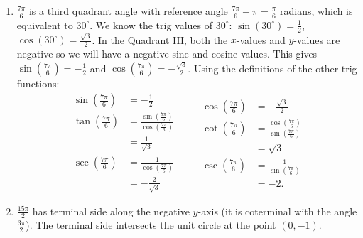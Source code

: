 \documentclass[nooutcomes]{ximera}
\begin{document}
\begin{exercise}
\begin{explanation}
\begin{enumerate}
			\item $\frac{7\pi}{6}$ is a third quadrant angle with reference angle $\frac{7\pi}{6} - \pi = \frac{\pi}{6}$ radians, which is equivalent to $30^\circ$.
				We know the trig values of $30^\circ$: $\sin(30^\circ)= \frac{1}{2}$, $\cos(30^\circ) = \frac{\sqrt{3}}{2}$.
				In the Quadrant III, both the $x$-values and $y$-values are negative so we will have a negative sine and cosine values.
				This gives
				$\sin\left( \frac{7\pi}{6} \right) = -\frac{1}{2}$ and $\cos\left( \frac{7\pi}{6}\right) = -\frac{\sqrt{3}}{2}$. Using the definitions of the other trig
				 functions:
				$$
				  \begin{aligned}
				  \sin\left( \frac{7\pi}{6} \right) &= -\frac{1}{2}\\
				  \tan\left( \frac{7\pi}{6} \right) &= \frac{\sin\left( \frac{7\pi}{6} \right)}{\cos\left( \frac{7\pi}{6} \right)}\\
					&= \frac{1}{\sqrt{3}}\\
				  \sec\left( \frac{7\pi}{6} \right) &= \frac{1}{\cos\left( \frac{7\pi}{6} \right)}\\
				  	&= -\frac{2}{\sqrt{3}}
				  \end{aligned}
				  \qquad
				  \begin{aligned}
				  \cos\left( \frac{7\pi}{6} \right) &= -\frac{\sqrt{3}}{2}\\
				  \cot\left( \frac{7\pi}{6} \right) &= \frac{\cos\left( \frac{7\pi}{6} \right)}{\sin\left( \frac{7\pi}{6} \right)}\\
					&= \sqrt{3}\\
				  \csc\left( \frac{7\pi}{6} \right) &= \frac{1}{\sin\left( \frac{7\pi}{6} \right)}\\
				  	&= -2.    
				  \end{aligned}
				  $$
				  
				  
				  
			
			\item $\frac{15\pi}{2}$ has terminal side along the negative $y$-axis (it is coterminal with the angle $\frac{3\pi}{2}$). The terminal side intersects
				the unit circle at the point $(0, -1)$.
				\begin{image}
\end{image}
\end{enumerate}
\end{explanation}
\end{exercise}
\end{document}
